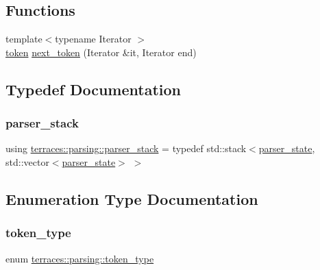 \subsection*{Functions}
\begin{DoxyCompactItemize}
\item 
{\footnotesize template$<$typename Iterator $>$ }\\\hyperlink{structterraces_1_1parsing_1_1token}{token} \hyperlink{namespaceterraces_1_1parsing_a4c942dddd8fa5f94ae9f069154b3131e}{next\+\_\+token} (Iterator \&it, Iterator end)
\end{DoxyCompactItemize}


\subsection{Typedef Documentation}
\mbox{\label{namespaceterraces_1_1parsing_a0e70b6a3cbf9868f7c92bbe10a6c4995}} 
\subsubsection{\texorpdfstring{parser\+\_\+stack}{parser\_stack}}
{\footnotesize\ttfamily using \hyperlink{namespaceterraces_1_1parsing_a0e70b6a3cbf9868f7c92bbe10a6c4995}{terraces\+::parsing\+::parser\+\_\+stack} = typedef std\+::stack$<$\hyperlink{structterraces_1_1parsing_1_1parser__state}{parser\+\_\+state}, std\+::vector$<$\hyperlink{structterraces_1_1parsing_1_1parser__state}{parser\+\_\+state}$>$ $>$}



\subsection{Enumeration Type Documentation}
\mbox{\label{namespaceterraces_1_1parsing_a2d265240dc54342f9462104d7a8392a1}} 
\subsubsection{\texorpdfstring{token\+\_\+type}{token\_type}}
{\footnotesize\ttfamily enum \hyperlink{namespaceterraces_1_1parsing_a2d265240dc54342f9462104d7a8392a1}{terraces\+::parsing\+::token\+\_\+type}\hspace{0.3cm}{\ttfamily [strong]}}

